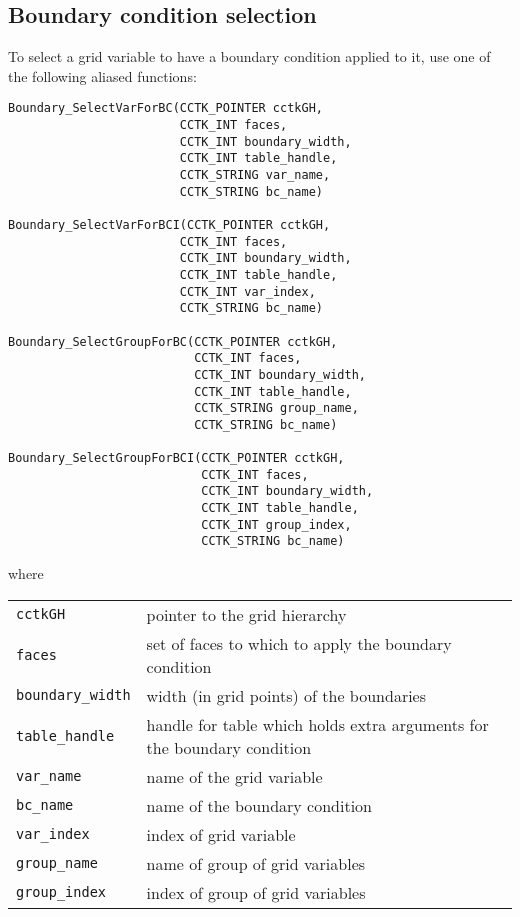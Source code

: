 \documentclass{article}
\begin{document}
\subsection{Boundary condition selection}

To select a grid variable to have a boundary condition applied to it,
use one of the following aliased functions:
\begin{verbatim}
Boundary_SelectVarForBC(CCTK_POINTER cctkGH,
                        CCTK_INT faces,
                        CCTK_INT boundary_width,
                        CCTK_INT table_handle, 
                        CCTK_STRING var_name, 
                        CCTK_STRING bc_name)

Boundary_SelectVarForBCI(CCTK_POINTER cctkGH,
                        CCTK_INT faces,
                        CCTK_INT boundary_width,
                        CCTK_INT table_handle, 
                        CCTK_INT var_index, 
                        CCTK_STRING bc_name)

Boundary_SelectGroupForBC(CCTK_POINTER cctkGH,
                          CCTK_INT faces,
                          CCTK_INT boundary_width,
                          CCTK_INT table_handle, 
                          CCTK_STRING group_name, 
                          CCTK_STRING bc_name)

Boundary_SelectGroupForBCI(CCTK_POINTER cctkGH,
                           CCTK_INT faces,
                           CCTK_INT boundary_width,
                           CCTK_INT table_handle, 
                           CCTK_INT group_index, 
                           CCTK_STRING bc_name)
\end{verbatim}
where

\begin{tabular}{ll}
\texttt{cctkGH} & pointer to the grid hierarchy\\
\texttt{faces} & set of faces to which to apply the boundary condition\\
\texttt{boundary\_width} & width (in grid points) of the boundaries\\
\texttt{table\_handle} & handle for table which holds extra arguments for the boundary condition\\
\texttt{var\_name} & name of the grid variable\\
\texttt{bc\_name} & name of the boundary condition\\
\texttt{var\_index} & index of grid variable\\
\texttt{group\_name} & name of group of grid variables\\
\texttt{group\_index} & index of group of grid variables
\end{tabular}
\end{document}
